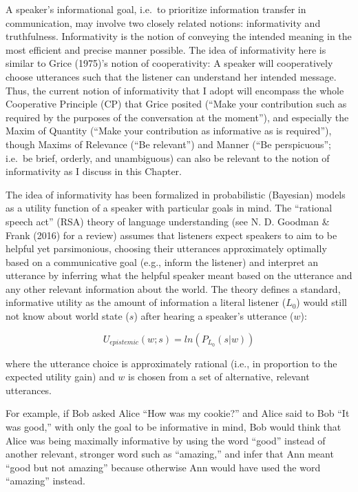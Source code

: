 \documentclass[oneside]{report}
\begin{document}
A speaker's informational goal, i.e.~to prioritize information transfer
in communication, may involve two closely related notions: informativity
and truthfulness. Informativity is the notion of conveying the intended
meaning in the most efficient and precise manner possible. The idea of
informativity here is similar to Grice (1975)'s notion of cooperativity:
A speaker will cooperatively choose utterances such that the listener
can understand her intended message. Thus, the current notion of
informativity that I adopt will encompass the whole Cooperative
Principle (CP) that Grice posited (``Make your contribution such as
required by the purposes of the conversation at the moment''), and
especially the Maxim of Quantity (``Make your contribution as
informative as is required''), though Maxims of Relevance (``Be
relevant'') and Manner (``Be perspicuous''; i.e.~be brief, orderly, and
unambiguous) can also be relevant to the notion of informativity as I
discuss in this Chapter.

The idea of informativity has been formalized in probabilistic
(Bayesian) models as a utility function of a speaker with particular
goals in mind. The ``rational speech act'' (RSA) theory of language
understanding (see N. D. Goodman \& Frank (2016) for a review) assumes
that listeners expect speakers to aim to be helpful yet parsimonious,
choosing their utterances approximately optimally based on a
communicative goal (e.g., inform the listener) and interpret an
utterance by inferring what the helpful speaker meant based on the
utterance and any other relevant information about the world. The theory
defines a standard, informative utility as the amount of information a
literal listener (\(L_0\)) would still not know about world state
(\(s\)) after hearing a speaker's utterance (\(w\)):

\[U_{epistemic}(w; s) = ln(P_{L_0}(s | w))\]

where the utterance choice is approximately rational (i.e., in
proportion to the expected utility gain) and \(w\) is chosen from a set
of alternative, relevant utterances.

For example, if Bob asked Alice ``How was my cookie?'' and Alice said to
Bob ``It was good,'' with only the goal to be informative in mind, Bob
would think that Alice was being maximally informative by using the word
``good'' instead of another relevant, stronger word such as ``amazing,''
and infer that Ann meant ``good but not amazing'' because otherwise Ann
would have used the word ``amazing'' instead.
\end{document}

